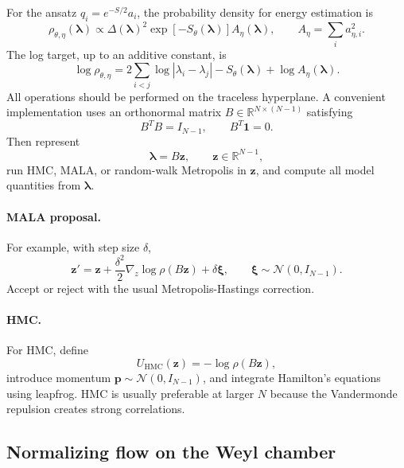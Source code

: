\documentclass[11pt]{article}
\newcommand{\R}{\mathbb R}
\newcommand{\calN}{\mathcal N}
\begin{document}
For the ansatz $q_i=e^{-S/2}a_i$, the probability density for energy estimation is
\begin{equation}
\boxed{
\rho_{\theta,\eta}(\bm\lambda)
\propto
\Delta(\bm\lambda)^2
\exp[-S_\theta(\bm\lambda)]
A_\eta(\bm\lambda),
\qquad
A_\eta=\sum_i a_{\eta,i}^2.
}
\label{eq:mcmc_target}
\end{equation}
The log target, up to an additive constant, is
\begin{equation}
\boxed{
\log\rho_{\theta,\eta}
=2\sum_{i<j}\log|\lambda_i-\lambda_j|
-S_\theta(\bm\lambda)
+\log A_\eta(\bm\lambda).
}
\label{eq:log_target}
\end{equation}
All operations should be performed on the traceless hyperplane.  A convenient implementation uses an orthonormal matrix $B\in\R^{N\times(N-1)}$ satisfying
\begin{equation}
B^TB=I_{N-1},
\qquad
B^T\bm1=0.
\end{equation}
Then represent
\begin{equation}
\bm\lambda=B\bm z,
\qquad
\bm z\in\R^{N-1},
\end{equation}
run HMC, MALA, or random-walk Metropolis in $\bm z$, and compute all model quantities from $\bm\lambda$.

\paragraph{MALA proposal.}
For example, with step size $\delta$,
\begin{equation}
\bm z' = \bm z+\frac{\delta^2}{2}\nabla_z\log\rho(B\bm z)+\delta\bm\xi,
\qquad
\bm\xi\sim\calN(0,I_{N-1}).
\end{equation}
Accept or reject with the usual Metropolis-Hastings correction.

\paragraph{HMC.}
For HMC, define
\begin{equation}
U_{\mathrm{HMC}}(\bm z)=-\log\rho(B\bm z),
\end{equation}
introduce momentum $\bm p\sim\calN(0,I_{N-1})$, and integrate Hamilton's equations using leapfrog.  HMC is usually preferable at larger $N$ because the Vandermonde repulsion creates strong correlations.

\subsection{Normalizing flow on the Weyl chamber}
\end{document}
